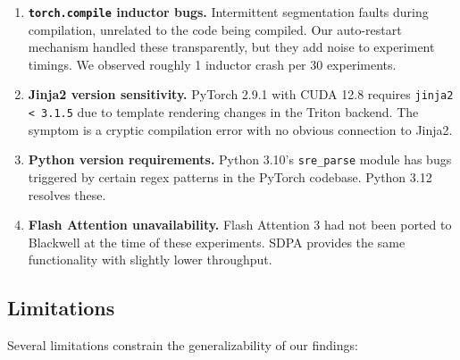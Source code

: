 \documentclass[11pt]{article}
\begin{document}
\begin{enumerate}[leftmargin=*]
    \item \textbf{\texttt{torch.compile} inductor bugs.} Intermittent segmentation faults during compilation, unrelated to the code being compiled. Our auto-restart mechanism handled these transparently, but they add noise to experiment timings. We observed roughly 1 inductor crash per 30 experiments.
    \item \textbf{Jinja2 version sensitivity.} PyTorch 2.9.1 with CUDA 12.8 requires \texttt{jinja2 < 3.1.5} due to template rendering changes in the Triton backend. The symptom is a cryptic compilation error with no obvious connection to Jinja2.
    \item \textbf{Python version requirements.} Python 3.10's \texttt{sre\_parse} module has bugs triggered by certain regex patterns in the PyTorch codebase. Python 3.12 resolves these.
    \item \textbf{Flash Attention unavailability.} Flash Attention 3 \citep{dao2024flashattention3} had not been ported to Blackwell at the time of these experiments. SDPA provides the same functionality with slightly lower throughput.
\end{enumerate}

\subsection{Limitations}
\label{sec:limitations}

Several limitations constrain the generalizability of our findings:
\end{document}
